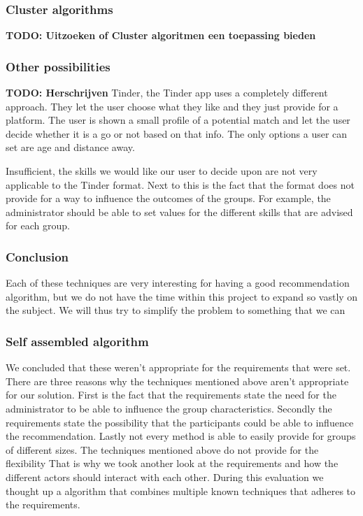 \documentclass[]{article}
\newcommand{\TODO}[1]{{\color{red}\textbf{TODO: #1}}}
\begin{document}
\subsubsection{Cluster algorithms}
\TODO{Uitzoeken of Cluster algoritmen een toepassing bieden}

\subsubsection{Other possibilities}
\TODO{Herschrijven}
Tinder, the Tinder app uses a completely different approach.
They let the user choose what they like and they just provide for a platform.
The user is shown a small profile of a potential match and let the user decide whether it is a go or not based on that info.
The only options a user can set are age and distance away.

Insufficient, the skills we would like our user to decide upon are not very applicable to the Tinder format.
Next to this is the fact that the format does not provide for a way to influence the outcomes of the groups.
For example, the administrator should be able to set values for the different skills that are advised for each group.


\subsubsection{Conclusion}

Each of these techniques are very interesting for having a good recommendation algorithm, but we do not have the time within this project to expand so vastly on the subject.
We will thus try to simplify the problem to something that we can

\subsubsection{Self assembled algorithm}
We concluded that these weren't appropriate for the requirements that were set.
There are three reasons why the techniques mentioned above aren't appropriate for our solution.
First is the fact that the requirements state the need for the administrator to be able to influence the group characteristics.
Secondly the requirements state the possibility that the participants could be able to influence the recommendation.
Lastly not every method is able to easily provide for groups of different sizes.
The techniques mentioned above do not provide for the flexibility 
That is why we took another look at the requirements and how the different actors should interact with each other.
During this evaluation we thought up a algorithm that combines multiple known techniques that adheres to the requirements.
\end{document}
